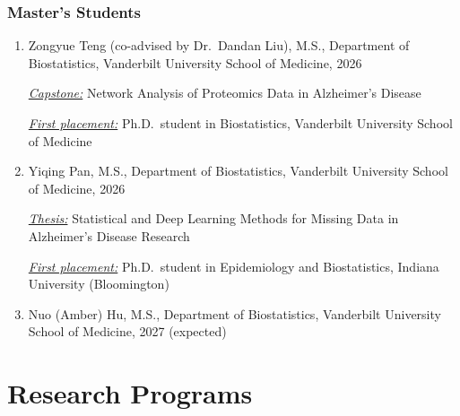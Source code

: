 \documentclass[12pt,letterpaper]{article}
\newenvironment{cventry}{\begin{minipage}[t]{\linewidth}}{\end{minipage}}
\begin{document}
	\subsubsection*{Master's Students}
	\begin{enumerate}
		\item\begin{cventry} Zongyue Teng (co-advised by Dr.\ Dandan Liu), M.S., 
		Department of Biostatistics, Vanderbilt University School of 
		Medicine, 2026
		
		{\em \underline{Capstone:}} Network Analysis of Proteomics 
		Data in Alzheimer's Disease
		
		{\em \underline{First placement:}} Ph.D.\ 
		student in Biostatistics, Vanderbilt University School of 
		Medicine
		\par\end{cventry}
		\item\begin{cventry} Yiqing Pan, M.S., Department of 
		Biostatistics, Vanderbilt University School of Medicine, 2026
		
		{\em \underline{Thesis:}} Statistical and Deep Learning 
		Methods for Missing Data in Alzheimer's Disease Research
		
		{\em \underline{First placement:}} Ph.D.\ 
		student in Epidemiology and Biostatistics, Indiana 
		University (Bloomington)
		\par\end{cventry}
		\item\begin{cventry} Nuo (Amber) Hu, M.S., Department of 
		Biostatistics, Vanderbilt University School of Medicine, 2027 
		(expected)
		\par\end{cventry}
	\end{enumerate}

	\section*{Research Programs}
\end{document}
